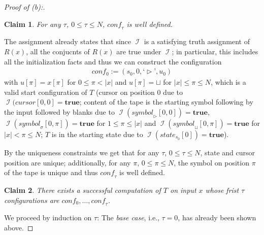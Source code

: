\documentclass [11pt]{article}
\newtheorem{claim}{Claim}
\newcommand{\blank}{\sqcup}
\newcommand{\ssym}{\triangleright}
\newcommand{\sym}[3]{\textit{symbol}_{#1}[#2,#3]}
\newcommand{\cursor}[2]{\textit{cursor}[#1,#2]}
\newcommand{\state}[2]{\textit{state}_{#1}[#2]}
\newcommand{\conf}{\textit{conf}}
\newcommand{\conft}{\ensuremath{\conf_{\tau}}}
\newcommand{\lqm}{\text{`}}
\newcommand{\rqm}{\text{'}}
\DeclareMathOperator{\II}{\mathcal{I}}
\newcommand{\True}{\mathbf{true}}
\begin{document}
\begin{proof}[Proof of (b):]
\begin{comment}
\emph{Outline:} Using the initialization facts and uniqueness constraints, we first show that $\conf_0$ is well defined. 
Next, we apply the transition rules and inertia rules (again together with the uniqueness constraints) to show that $conf_1$ is well defined and a valid successor configuration (i.e., it is possible for $T$ to transition from $conf_0$ to $conf_1$ by applying exactly one transition from $\Delta$.). 
We then show by induction that there exists a successful computation of $T$ on input $x$ whose frist $\tau$ configuration are $conf_0,\dots ,\conft$.
\end{comment}
\begin{claim}
For any $\tau$, $0\leq \tau \leq N$, $\conft$ is well defined.
\end{claim}

\noindent
The assignment already states that since $\II$ is a satisfying truth assignment of $R(x)$, all the conjucnts of $R(x)$ are true under $\II$; in particular, this includes all the initialization facts and thus we can construct the configuration
\begin{align*}
 conf_0 := (s_0, 0, \lqm \ssym \rqm, u_0)
\end{align*}
with $u[\pi] = x[\pi]$ for $0 \leq \pi < |x|$ and $u[\pi] = \blank$ for $|x| \leq \pi \leq N$, which is a valid start configuration of $T$ (cursor on position 0 due to $\II(\cursor{0}{0} = \True$; content of the tape is the starting symbol following by the input followed by blanks due to $\II(\sym{\ssym}{0}{0}) = \True$, $\II(\sym{\sigma}{0}{\pi}) = \True$ for $ 1 \leq \pi \leq |x|$ and $\II(\sym{\blank}{0}{\pi}) =\True$ for $|x| < \pi \leq N$; $T$ is in the starting state due to $\II(\state{s_0}{0}) = \True$).

By the uniqueness constraints we get that for any $\tau$, $0\leq \tau \leq N$, state and cursor position are unique; additionally, for any $\pi$, $0\leq \pi \leq N$, the symbol on position $\pi$ of the tape is unique and thus $\conf_\tau$ is well defined. 

\begin{claim}
There exists a successful computation of $T$ on input $x$ whose frist $\tau$ configurations are $conf_0,\dots ,\conft$.
\end{claim}

\noindent
We proceed by induction on $\tau$: 
The \emph{base case}, i.e., $\tau=0$, has already been shown above.


\end{proof}
\end{document}
